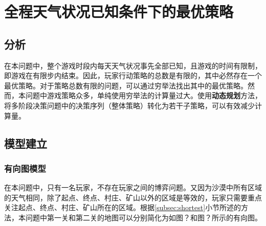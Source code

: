 \documentclass[withoutpreface,bwprint]{cumcmthesis} %
\begin{document}
\section{全程天气状况已知条件下的最优策略}
\label{sec:simulate}

\subsection{分析}
在本问题中，整个游戏时段内每天天气状况事先全部已知，且游戏的时间有限制，即游戏在有限步内结束。因此，玩家行动策略的总数是有限的，其中必然存在一个最优策略。对于策略总数有限的问题，可以通过穷举法找出其中的最优策略。然而，本问题中游戏策略众多，单纯使用穷举法的计算量过大。使用\textbf{动态规划}方法，将多阶段决策问题中的决策序列（整体策略）转化为若干子策略，可以有效减少计算量。

\subsection{模型建立}
\subsubsection{有向图模型}
在本问题中，只有一名玩家，不存在玩家之间的博弈问题。又因为沙漠中所有区域的天气相同，除了起点、终点、村庄、矿山以外的区域是等效的，玩家只需要重点关注起点、终点、村庄、矿山所在的区域。根据\ref{subsec:shortest}小节所述的方法，本问题中第一关和第二关的地图可以分别简化为如图？和图？所示的有向图。
\end{document}
